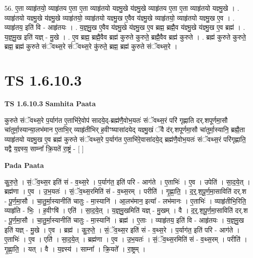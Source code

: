 \documentclass[17pt]{extarticle}
\begin{document}
56. ए॒ता व्याहृ॑तयो॒ व्याहृ॑तय ए॒ता ए॒ता व्याहृ॑तयो यज्ञ्मु॒खे य॑ज्ञ्मु॒खे व्याहृ॑तय ए॒ता ए॒ता व्याहृ॑तयो यज्ञ्मु॒खे । . व्याहृ॑तयो यज्ञ्मु॒खे य॑ज्ञ्मु॒खे व्याहृ॑तयो॒ व्याहृ॑तयो यज्ञ्मु॒ख ए॒वैव य॑ज्ञ्मु॒खे व्याहृ॑तयो॒ व्याहृ॑तयो यज्ञ्मु॒ख ए॒व । . व्याहृ॑तय॒ इति॑ वि - आहृ॑तयः । . य॒ज्ञ्॒मु॒ख ए॒वैव य॑ज्ञ्मु॒खे य॑ज्ञ्मु॒ख ए॒व ब्रह्म॒ ब्रह्मै॒व य॑ज्ञ्मु॒खे य॑ज्ञ्मु॒ख ए॒व ब्रह्म॑ । . य॒ज्ञ्॒मु॒ख इति॑ यज्ञ् - मु॒खे । . ए॒व ब्रह्म॒ ब्रह्मै॒वैव ब्रह्म॑ कुरुते कुरुते॒ ब्रह्मै॒वैव ब्रह्म॑ कुरुते । . ब्रह्म॑ कुरुते कुरुते॒ ब्रह्म॒ ब्रह्म॑ कुरुते संॅवथ्स॒रे सं॑ॅवथ्स॒रे कु॑रुते॒ ब्रह्म॒ ब्रह्म॑ कुरुते संॅवथ्स॒रे । \newline
\pagebreak
{}

\section{ TS 1.6.10.3 }

\textbf{TS 1.6.10.3 } \newline
\textbf{Samhita Paata} \newline

कुरुते संॅवथ्स॒रे प॒र्याग॑त ए॒ताभि॑रे॒वोप॑ सादये॒द्-ब्रह्म॑णै॒वोभ॒यतः॑ संॅवथ्स॒रं परि॑ गृह्णाति दर्.शपूर्णमा॒सौ चा॑तुर्मा॒स्यान्या॒लभ॑मान ए॒ताभि॒र् व्याहृ॑तीभिर् ह॒वीꣳष्यासा॑दयेद् यज्ञ्मु॒खं ॅवै द॑र्.शपूर्णमा॒सौ चा॑तुर्मा॒स्यानि॒ ब्रह्मै॒ता व्याहृ॑तयो यज्ञ्मु॒ख ए॒व ब्रह्म॑ कुरुते संॅवथ्स॒रे प॒र्याग॑त ए॒ताभि॑रे॒वासा॑दये॒द् ब्रह्म॑णै॒वोभ॒यतः॑ संॅवथ्स॒रं परि॑गृह्णाति॒ यद्वै य॒ज्ञ्स्य॒ साम्ना᳚ क्रि॒यते॑ रा॒ष्ट्रं - [ ] \newline

\textbf{Pada Paata} \newline

कु॒रु॒ते॒ । सं॒ॅव॒थ्स॒र इति॑ सं - व॒थ्स॒रे । प॒र्याग॑त॒ इति॑ परि - आग॑ते । ए॒ताभिः॑ । ए॒व । उपेति॑ । सा॒द॒ये॒त् । ब्रह्म॑णा । ए॒व । उ॒भ॒यतः॑ । सं॒ॅव॒थ्स॒रमिति॑ सं - व॒थ्स॒रम् । परीति॑ । गृ॒ह्णा॒ति॒ । द॒र्॒.श॒पू॒र्ण॒मा॒साविति॑ दर्.श - पू॒र्ण॒मा॒सौ । चा॒तु॒र्मा॒स्यानीति॑ चातुः - मा॒स्यानि॑ । आ॒लभ॑मान॒ इत्या᳚ - लभ॑मानः । ए॒ताभिः॑ । व्याहृ॑तीभि॒रिति॒ व्याहृ॑ति - भिः॒ । ह॒वीꣳषि॑ । एति॑ । सा॒द॒ये॒त् । य॒ज्ञ्॒मु॒खमिति॑ यज्ञ् - मु॒खम् । वै । द॒र्॒.श॒पू॒र्ण॒मा॒साविति॑ दर्.श - पू॒र्ण॒मा॒सौ । चा॒तु॒र्मा॒स्यानीति॑ चातुः - मा॒स्यानि॑ । ब्रह्म॑ । ए॒ताः । व्याहृ॑तय॒ इति॑ वि - आहृ॑तयः । य॒ज्ञ्॒मु॒ख इति॑ यज्ञ् - मु॒खे । ए॒व । ब्रह्म॑ । कु॒रु॒ते॒ । सं॒ॅव॒थ्स॒र इति॑ सं - व॒थ्स॒रे । प॒र्याग॑त॒ इति॑ परि - आग॑ते । ए॒ताभिः॑ । ए॒व । एति॑ । सा॒द॒ये॒त् । ब्रह्म॑णा । ए॒व । उ॒भ॒यतः॑ । सं॒ॅव॒थ्स॒रमिति॑ सं - व॒थ्स॒रम् । परीति॑ । गृ॒ह्णा॒ति॒ । यत् । वै । य॒ज्ञ्स्य॑ । साम्ना᳚ । क्रि॒यते᳚ । रा॒ष्ट्रम् ।  \newline
\end{document}
